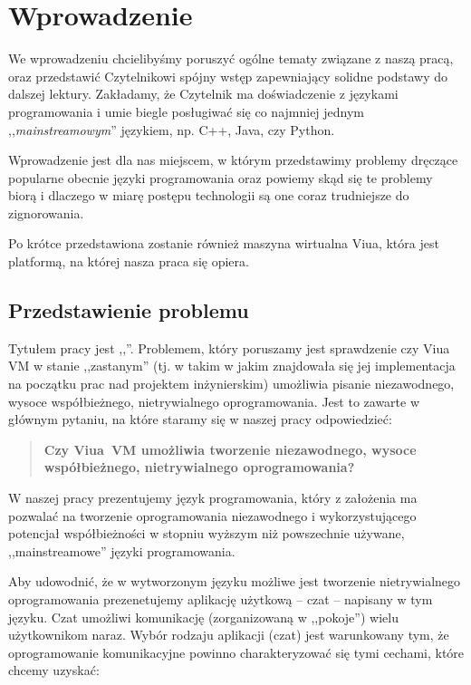 \chapter{Wprowadzenie}
\label{wprowadzenie}

We wprowadzeniu chcielibyśmy poruszyć ogólne tematy związane z naszą pracą, oraz
przedstawić Czytelnikowi spójny wstęp zapewniający solidne podstawy do dalszej
lektury. Zakładamy, że Czytelnik ma doświadczenie z językami programowania i
umie biegle posługiwać się co najmniej jednym ,,\emph{mainstreamowym}''
językiem, np.  C++, Java, czy Python.

Wprowadzenie jest dla nas miejscem, w którym przedstawimy problemy dręczące
popularne obecnie języki programowania oraz powiemy skąd się te problemy biorą i
dlaczego w miarę postępu technologii są one coraz trudniejsze do zignorowania.

Po krótce przedstawiona zostanie również maszyna wirtualna Viua, która jest
platformą, na której nasza praca się opiera.

\section{Przedstawienie problemu}
\label{wprowadzenei_problem}

Tytułem pracy jest ,,\inzmaintitlePL''. Problemem, który poruszamy jest
sprawdzenie czy Viua VM w stanie ,,zastanym'' (tj. w takim w jakim znajdowała
się jej implementacja na początku prac nad projektem inżynierskim) umożliwia
pisanie niezawodnego, wysoce współbieżnego, nietrywialnego oprogramowania. Jest
to zawarte w głównym pytaniu, na które staramy się w naszej pracy odpowiedzieć:

\begin{large}
\begin{quote}
    \textbf{Czy Viua~VM umożliwia tworzenie niezawodnego, wysoce współbieżnego,
    nietrywialnego oprogramowania?}
\end{quote}
\end{large}

W naszej pracy prezentujemy język programowania, który z założenia ma pozwalać
na tworzenie oprogramowania niezawodnego i wykorzystującego potencjał
współbieżności w stopniu wyższym niż powszechnie używane, ,,mainstreamowe''
języki programowania.

Aby udowodnić, że w wytworzonym języku możliwe jest tworzenie nietrywialnego
oprogramowania prezenetujemy aplikację użytkową -- czat -- napisany w tym
języku. Czat umożliwi komunikację (zorganizowaną w ,,pokoje'') wielu
użytkownikom naraz. Wybór rodzaju aplikacji (czat) jest warunkowany tym, że
oprogramowanie komunikacyjne powinno charakteryzować się tymi cechami, które
chcemy uzyskać:

